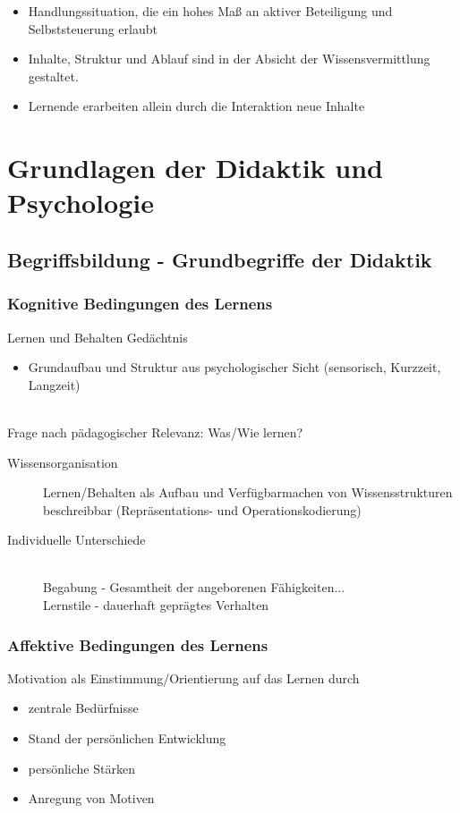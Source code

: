 \documentclass[a4paper]{article}
\begin{document}
\begin{itemize}
	\item Handlungssituation, die ein hohes Maß an aktiver Beteiligung und Selbststeuerung erlaubt
	\item Inhalte, Struktur und Ablauf sind in der Absicht der Wissensvermittlung gestaltet.
	\item Lernende erarbeiten allein durch die Interaktion neue Inhalte
\end{itemize}

\section{Grundlagen der Didaktik und Psychologie}

\subsection{Begriffsbildung - Grundbegriffe der Didaktik}

\subsubsection{Kognitive Bedingungen des Lernens}
Lernen und Behalten \textrightarrow Gedächtnis
\begin{itemize}
	\item Grundaufbau und Struktur aus psychologischer Sicht
	(sensorisch, Kurzzeit, Langzeit)
\end{itemize}
~\\
Frage nach pädagogischer Relevanz: Was/Wie lernen?

\begin{description}
	\item[Wissensorganisation] Lernen/Behalten als Aufbau und Verfügbarmachen von Wissensstrukturen beschreibbar (Repräsentations- und Operationskodierung)
	\item[Individuelle Unterschiede] ~\\Begabung - Gesamtheit der angeborenen Fähigkeiten...\\
	Lernstile - dauerhaft geprägtes Verhalten
\end{description}

\subsubsection{Affektive Bedingungen des Lernens}

Motivation als Einstimmung/Orientierung auf das Lernen durch
\begin{itemize}
	\item zentrale Bedürfnisse
	\item Stand der persönlichen Entwicklung
	\item persönliche Stärken
	\item Anregung von Motiven
\end{itemize}
\end{document}
